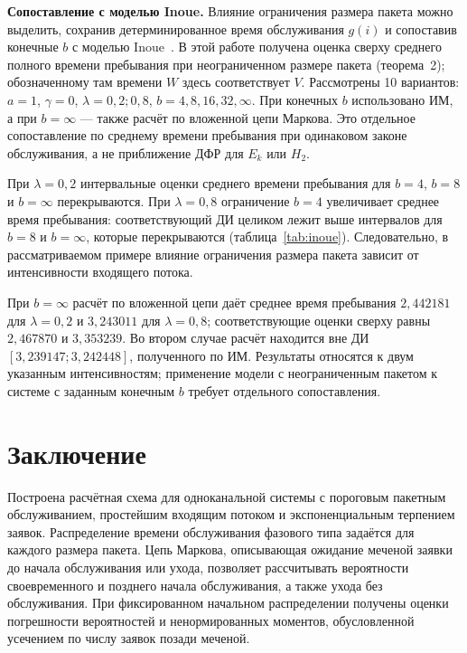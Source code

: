 \noindent\textbf{Сопоставление с моделью Inoue.}
Влияние ограничения размера пакета можно выделить, сохранив детерминированное время обслуживания $g(i)$ и сопоставив конечные $b$ с моделью Inoue~\cite{inoue2021}. В этой работе получена оценка сверху среднего полного времени пребывания при неограниченном размере пакета (теорема~2); обозначенному там времени $W$ здесь соответствует $V$. Рассмотрены 10 вариантов: $a=1$, $\gamma=0$, $\lambda=0{,}2;0{,}8$, $b=4,8,16,32,\infty$. При конечных $b$ использовано ИМ, а при $b=\infty$ --- также расчёт по вложенной цепи Маркова. Это отдельное сопоставление по среднему времени пребывания при одинаковом законе обслуживания, а не приближение ДФР для $E_k$ или $H_2$.

\begin{table}[htbp]\centering\small
\caption{Среднее время пребывания при детерминированном обслуживании $g(i)$, $a=1$, $\gamma=0$: ИМ, расчёт по вложенной цепи и оценка сверху}\label{tab:inoue}

\end{table}

При $\lambda=0{,}2$ интервальные оценки среднего времени пребывания для $b=4$, $b=8$ и $b=\infty$ перекрываются. При $\lambda=0{,}8$ ограничение $b=4$ увеличивает среднее время пребывания: соответствующий ДИ целиком лежит выше интервалов для $b=8$ и $b=\infty$, которые перекрываются (таблица~\ref{tab:inoue}). Следовательно, в рассматриваемом примере влияние ограничения размера пакета зависит от интенсивности входящего потока.

При $b=\infty$ расчёт по вложенной цепи даёт среднее время пребывания $2{,}442181$ для $\lambda=0{,}2$ и $3{,}243011$ для $\lambda=0{,}8$; соответствующие оценки сверху равны $2{,}467870$ и $3{,}353239$. Во втором случае расчёт находится вне ДИ $[3{,}239147;3{,}242448]$, полученного по ИМ. Результаты относятся к двум указанным интенсивностям; применение модели с неограниченным пакетом к системе с заданным конечным $b$ требует отдельного сопоставления.

\section*{Заключение}

Построена расчётная схема для одноканальной системы с пороговым пакетным обслуживанием, простейшим входящим потоком и экспоненциальным терпением заявок. Распределение времени обслуживания фазового типа задаётся для каждого размера пакета. Цепь Маркова, описывающая ожидание меченой заявки до начала обслуживания или ухода, позволяет рассчитывать вероятности своевременного и позднего начала обслуживания, а также ухода без обслуживания. При фиксированном начальном распределении получены оценки погрешности вероятностей и ненормированных моментов, обусловленной усечением по числу заявок позади меченой.

